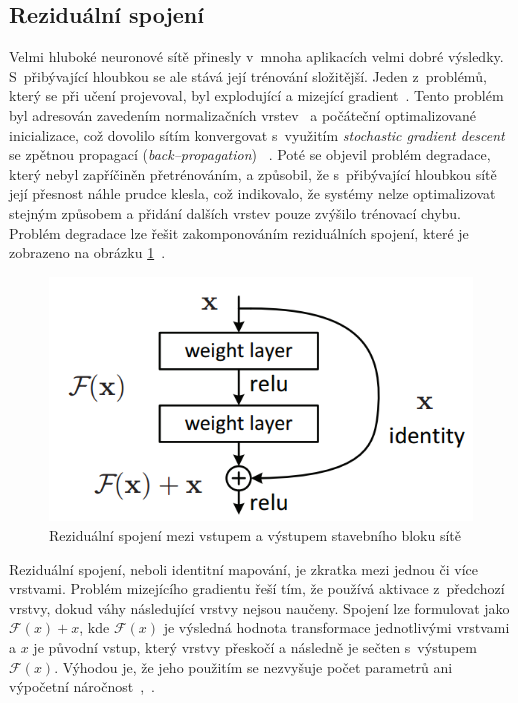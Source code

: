 \subsection{Reziduální spojení}
Velmi hluboké neuronové sítě přinesly v~mnoha aplikacích velmi dobré výsledky. S~přibývající hloubkou se ale stává její trénování složitější. Jeden z~problémů, který se při učení projevoval, byl explodující a mizející gradient~\cite{279181}. Tento problém byl adresován zavedením normalizačních vrstev~\cite{ioffe2015batch} a počáteční optimalizované inicializace, což dovolilo sítím konvergovat s~využitím \textit{stochastic gradient descent} se zpětnou propagací (\textit{back--propagation})~ \cite{6795724}. Poté se objevil problém degradace, který nebyl zapříčiněn přetrénováním, a způsobil, že s~přibývající hloubkou sítě její přesnost náhle prudce klesla, což indikovalo, že systémy nelze optimalizovat stejným způsobem a přidání dalších vrstev pouze zvýšilo trénovací chybu. Problém degradace lze řešit zakomponováním reziduálních spojení, které je zobrazeno na obrázku \ref{fig:residualconnection}~\cite{he2015deep}.

\begin{figure}[H]
    \centering
    \includegraphics[scale=0.5]{obrazky-figures/residual_connection.png}
    \caption{\label{fig:residualconnection}Reziduální spojení mezi vstupem a výstupem stavebního bloku sítě~\cite{he2015deep}}
\end{figure}

Reziduální spojení, neboli identitní mapování, je zkratka mezi jednou či více vrstvami. Problém mizejícího gradientu řeší tím, že používá aktivace z~předchozí vrstvy, dokud váhy následující vrstvy nejsou naučeny. Spojení lze formulovat jako $\mathcal{F}(x) + x$, kde $\mathcal{F}(x)$ je výsledná hodnota transformace jednotlivými vrstvami a $x$ je původní vstup, který vrstvy přeskočí a následně je sečten s~výstupem $\mathcal{F}(x)$. Výhodou je, že jeho použitím se nezvyšuje počet parametrů ani výpočetní náročnost~\cite{he2015deep},~\cite{zaeemzadeh2018normpreservation}.



